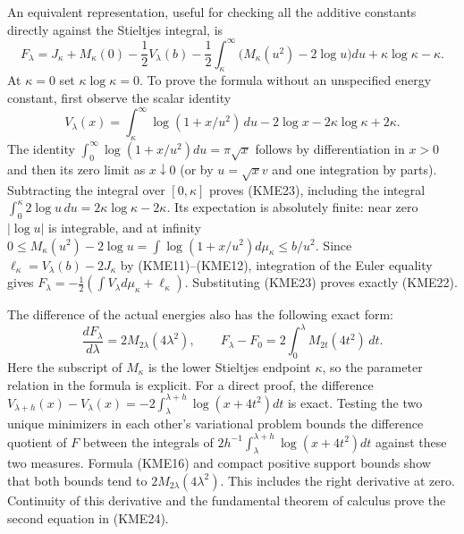 \documentclass[11pt,a4paper]{article}
\begin{document}
An equivalent representation, useful for checking all the additive
constants directly against the Stieltjes integral, is
\begin{equation}\tag{KME22}
 \boxed{F_\lambda=J_\kappa+M_\kappa(0)-\frac12V_\lambda(b)
      -\frac12\int_\kappa^\infty\bigl(M_\kappa(u^2)-2\log u\bigr)du
                          +\kappa\log \kappa-\kappa.}
\end{equation}
At $\kappa=0$ set $\kappa\log \kappa=0$.
To prove the formula without an unspecified energy constant, first
observe the scalar identity
\begin{equation}\tag{KME23}
 V_\lambda(x)=\int_\kappa^\infty\log(1+x/u^2)\,du
                           -2\log x-2\kappa\log \kappa+2\kappa.
\end{equation}
The identity $\int_0^\infty\log(1+x/u^2)du=\pi\sqrt x$
follows by differentiation in $x>0$ and then its zero limit as
$x\downarrow0$ (or by $u=\sqrt x v$ and one integration by parts).
Subtracting the integral over $[0,\kappa]$ proves (KME23), including the
integral $\int_0^\kappa2\log u\,du=2\kappa\log \kappa-2\kappa$.
Its expectation is absolutely finite: near zero $|\log u|$ is
integrable, and at infinity
$0\leq M_\kappa(u^2)-2\log u
=\int\log(1+x/u^2)d\mu_\kappa\leq b/u^2$.
Since $\ell_\kappa=V_\lambda(b)-2J_\kappa$ by (KME11)--(KME12), integration
of the Euler equality gives
$F_\lambda=-\tfrac12(\int V_\lambda d\mu_\kappa+\ell_\kappa)$.
Substituting (KME23) proves exactly (KME22).

The difference of the actual energies also has the following exact form:
\begin{equation}\tag{KME24}
 \boxed{\frac{dF_\lambda}{d\lambda}=2M_{2\lambda}(4\lambda^2),
 \qquad F_\lambda-F_0=2\int_0^\lambda M_{2t}(4t^2)\,dt.}
\end{equation}
Here the subscript of $M_\kappa$ is the lower Stieltjes endpoint $\kappa$, so
the parameter relation in the formula is explicit.
For a direct proof, the difference
$V_{\lambda+h}(x)-V_\lambda(x)
=-2\int_\lambda^{\lambda+h}\log(x+4t^2)dt$
is exact. Testing the two unique minimizers in each other's variational
problem bounds the difference quotient of $F$ between the integrals
of $2h^{-1}\int_\lambda^{\lambda+h}\log(x+4t^2)dt$ against these
two measures. Formula (KME16) and compact positive support bounds show
that both bounds tend to $2M_{2\lambda}(4\lambda^2)$.
This includes the right derivative at zero. Continuity of this
derivative and the fundamental theorem of calculus prove the second
equation in (KME24).
\end{document}
